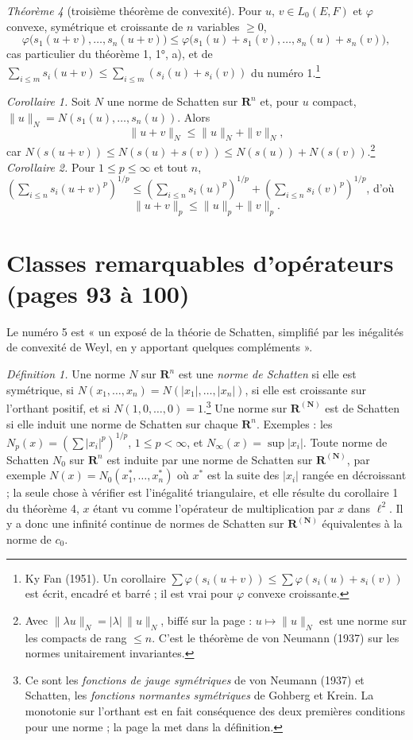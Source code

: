 \documentclass[11pt,a4paper]{article}
\begin{document}
\emph{Théorème 4} (troisième théorème de convexité). Pour $u$, $v \in
L_0(E,F)$ et $\varphi$ convexe, symétrique et croissante de $n$ variables
$\geq 0$,
\[
  \varphi\bigl(s_1(u+v), \ldots, s_n(u+v)\bigr) \leq
  \varphi\bigl(s_1(u) + s_1(v), \ldots, s_n(u) + s_n(v)\bigr),
\]
cas particulier du théorème 1, 1°, a), et de $\sum_{i \leq m} s_i(u+v) \leq
\sum_{i \leq m} (s_i(u) + s_i(v))$ du numéro 1.\footnote{Ky Fan (1951). Un
corollaire $\sum \varphi(s_i(u+v)) \leq \sum \varphi(s_i(u) + s_i(v))$ est
écrit, encadré et barré ; il est vrai pour $\varphi$ convexe croissante.}

\emph{Corollaire 1.} Soit $N$ une norme de Schatten sur $\mathbf{R}^n$ et,
pour $u$ compact, $\|u\|_N = N(s_1(u), \ldots, s_n(u))$. Alors
\[
  \|u + v\|_N \leq \|u\|_N + \|v\|_N,
\]
car $N(s(u+v)) \leq N(s(u) + s(v)) \leq N(s(u)) + N(s(v))$.\footnote{Avec
$\|\lambda u\|_N = |\lambda|\,\|u\|_N$, biffé sur la page : $u \mapsto
\|u\|_N$ est une norme sur les compacts de rang $\leq n$. C'est le théorème
de von Neumann (1937) sur les normes unitairement invariantes.}
\emph{Corollaire 2.} Pour $1 \leq p \leq \infty$ et tout $n$,
$(\sum_{i \leq n} s_i(u+v)^p)^{1/p} \leq (\sum_{i \leq n} s_i(u)^p)^{1/p} +
(\sum_{i \leq n} s_i(v)^p)^{1/p}$, d'où
\[
  \|u + v\|_p \leq \|u\|_p + \|v\|_p .
\]

\section*{Classes remarquables d'opérateurs (pages 93 à 100)}

Le numéro 5 est « un exposé de la théorie de Schatten, simplifié par les
inégalités de convexité de Weyl, en y apportant quelques compléments ».

\emph{Définition 1.} Une norme $N$ sur $\mathbf{R}^n$ est une \emph{norme de
Schatten} si elle est symétrique, si $N(x_1, \ldots, x_n) = N(|x_1|, \ldots,
|x_n|)$, si elle est croissante sur l'orthant positif, et si $N(1, 0, \ldots,
0) = 1$.\footnote{Ce sont les \emph{fonctions de jauge symétriques} de von
Neumann (1937) et Schatten, les \emph{fonctions normantes symétriques} de
Gohberg et Krein. La monotonie sur l'orthant est en fait conséquence des
deux premières conditions pour une norme ; la page la met dans la
définition.} Une norme sur $\mathbf{R}^{(\mathbf{N})}$ est de Schatten si
elle induit une norme de Schatten sur chaque $\mathbf{R}^n$. Exemples : les
$N_p(x) = (\sum |x_i|^p)^{1/p}$, $1 \leq p < \infty$, et $N_\infty(x) =
\sup |x_i|$. Toute norme de Schatten $N_0$ sur $\mathbf{R}^n$ est induite
par une norme de Schatten sur $\mathbf{R}^{(\mathbf{N})}$, par exemple
$N(x) = N_0(x^{*}_1, \ldots, x^{*}_n)$ où $x^{*}$ est la suite des $|x_i|$
rangée en décroissant ; la seule chose à vérifier est l'inégalité
triangulaire, et elle résulte du corollaire 1 du théorème 4, $x$ étant vu
comme l'opérateur de multiplication par $x$ dans $\ell^2$. Il y a donc une
infinité continue de normes de Schatten sur $\mathbf{R}^{(\mathbf{N})}$
équivalentes à la norme de $c_0$.
\end{document}
